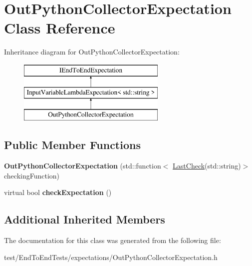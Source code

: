 \hypertarget{classOutPythonCollectorExpectation}{}\section{Out\+Python\+Collector\+Expectation Class Reference}
\label{classOutPythonCollectorExpectation}
Inheritance diagram for Out\+Python\+Collector\+Expectation\+:\begin{figure}[H]
\begin{center}
\leavevmode
\includegraphics[height=3.000000cm]{classOutPythonCollectorExpectation}
\end{center}
\end{figure}
\subsection*{Public Member Functions}
\begin{DoxyCompactItemize}
\item 
{\bfseries Out\+Python\+Collector\+Expectation} (std\+::function$<$ \hyperlink{structLastCheck}{Last\+Check}(std\+::string)$>$ checking\+Function)\hypertarget{classOutPythonCollectorExpectation_a6c79885b08bdf6a2f8299458eb29e688}{}\label{classOutPythonCollectorExpectation_a6c79885b08bdf6a2f8299458eb29e688}

\item 
virtual bool {\bfseries check\+Expectation} ()\hypertarget{classOutPythonCollectorExpectation_ad6eb205766e21c1195678282b55a0dfc}{}\label{classOutPythonCollectorExpectation_ad6eb205766e21c1195678282b55a0dfc}

\end{DoxyCompactItemize}
\subsection*{Additional Inherited Members}


The documentation for this class was generated from the following file\+:\begin{DoxyCompactItemize}
\item 
test/\+End\+To\+End\+Tests/expectations/Out\+Python\+Collector\+Expectation.\+h\end{DoxyCompactItemize}
